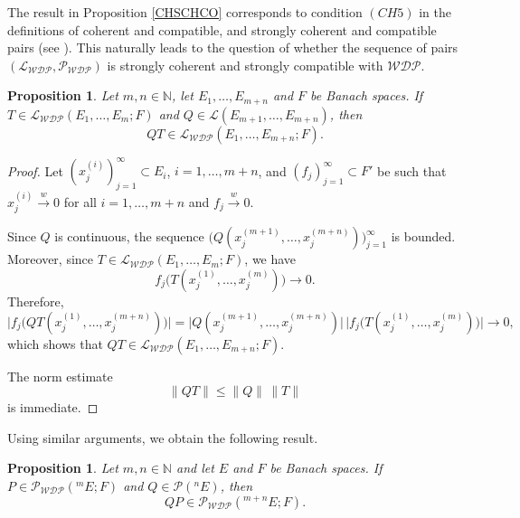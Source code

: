 \documentclass[12 pt]{article}%
\newtheorem{proposition}[theorem]{Proposition}
\newtheorem{final remark}[theorem]{Final Remark}
\begin{document}
The result in Proposition \ref{CHSCHCO} corresponds to condition $(CH5)$ in the definitions of coherent and compatible, and strongly coherent and compatible pairs (see \cite{PR14, RST22}). This naturally leads to the question of whether the sequence of pairs $\left(\mathcal{L_{WDP}}, \mathcal{P_{WDP}}\right)$ is strongly coherent and strongly compatible with $\mathcal{WDP}$.

\begin{proposition}
	Let $m,n \in \mathbb{N}$, let $E_1,\dots,E_{m+n}$ and $F$ be Banach spaces. If $T \in \mathcal{L_{WDP}}(E_1,\dots,E_m;F)$ and $Q \in \mathcal{L}(E_{m+1},\dots,E_{m+n})$, then
	\[
	QT \in \mathcal{L_{WDP}}(E_1,\dots,E_{m+n};F).
	\]
\end{proposition}

\begin{proof}
	Let $(x_j^{(i)})_{j=1}^{\infty} \subset E_i$, $i=1,\dots,m+n$, and $(f_j)_{j=1}^{\infty} \subset F'$ be such that $x_j^{(i)} \overset{w}{\to} 0$ for all $i=1,\dots,m+n$ and $f_j \overset{w}{\to} 0$.
	
	Since $Q$ is continuous, the sequence $\big(Q(x_j^{(m+1)},\dots,x_j^{(m+n)})\big)_{j=1}^{\infty}$ is bounded. Moreover, since $T \in \mathcal{L_{WDP}}(E_1,\dots,E_m;F)$, we have
	\[
	f_j\big(T(x_j^{(1)},\dots,x_j^{(m)})\big) \longrightarrow 0.
	\]
	Therefore,
	\[
	\big|f_j\big(QT(x_j^{(1)},\dots,x_j^{(m+n)})\big)\big|
	= \big|Q(x_j^{(m+1)},\dots,x_j^{(m+n)})\big|
	\, \big|f_j\big(T(x_j^{(1)},\dots,x_j^{(m)})\big)\big|
	\longrightarrow 0,
	\]
	which shows that $QT \in \mathcal{L_{WDP}}(E_1,\dots,E_{m+n};F)$.
	
	The norm estimate
	\[
	\|QT\| \le \|Q\| \, \|T\|
	\]
	is immediate.
\end{proof}


Using similar arguments, we obtain the following result.

\begin{proposition}\label{CH3CHCO}
	Let $m,n \in \mathbb{N}$ and let $E$ and $F$ be Banach spaces. If $P \in \mathcal{P_{WDP}}(^mE;F)$ and $Q \in \mathcal{P}(^nE)$, then
	\[
	QP \in \mathcal{P_{WDP}}(^{m+n}E;F).
	\]
\end{proposition}
\end{document}
